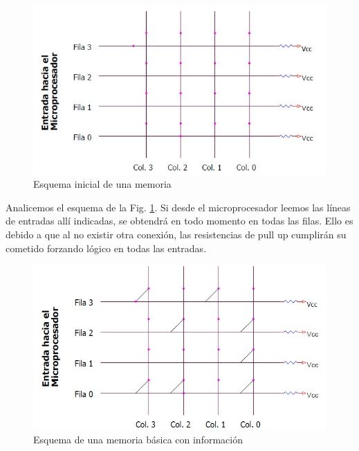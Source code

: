 \documentclass[12pt]{book}
\theoremstyle{definition}
\theoremstyle{remark}
\theoremstyle{plain}
\begin{document}
\begin{figure}
\centering
\includegraphics[width=5in]{entrada.jpg}
\caption{Esquema inicial de una memoria}
\label{fig7}
\end{figure}

Analicemos el esquema de la Fig. \ref{fig7}. Si desde el microprocesador leemos las líneas de entradas allí indicadas, se obtendrá en todo momento  \grqq en todas las filas. Ello es debido a que al no existir otra conexión, las resistencias de pull up cumplirán su cometido forzando  \grqq lógico en todas las entradas.

\begin{figure}
\centering
\includegraphics[width=5in]{entrada2.jpg}
\caption{Esquema de una memoria básica con información}
\label{fig8}
\end{figure}
\end{document}
